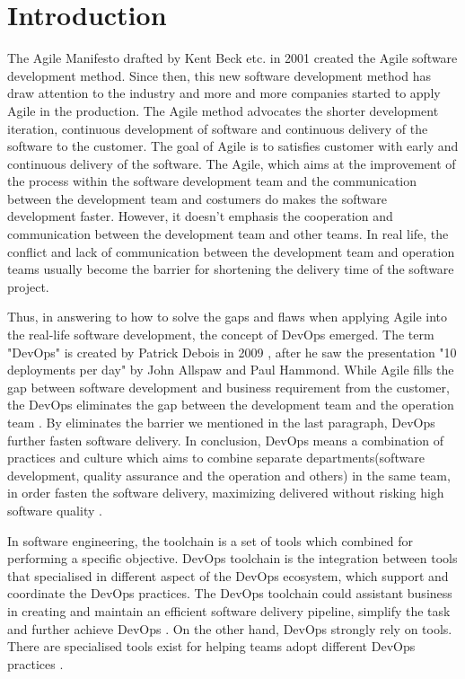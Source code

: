 \chapter{Introduction}
\label{chp:introduction}
The Agile Manifesto \cite{beck2001manifesto} drafted by Kent Beck etc. in 2001 created the Agile software development method. Since then, this new software development method has draw attention to the industry and more and more companies started to apply Agile in the production.
The Agile method advocates the shorter development iteration, continuous development of software and continuous delivery of the software to the customer. The goal \cite{beck2001manifesto} of Agile is to satisfies customer with early and continuous delivery of the software.
The Agile, which aims at the improvement of the process within the software development team and the communication between the development team and costumers \cite{miglierina2014application} do makes the software development faster. However, it doesn't emphasis the cooperation and communication between the development team and other teams. In real life, the conflict and lack of communication between the development team and operation teams usually become the barrier for shortening the delivery time of the software project.
\par
Thus, in answering to how to solve the gaps and flaws when applying Agile into the real-life software development, the concept of DevOps emerged. The term "DevOps" is created by Patrick Debois in 2009 \cite{kim2016devops}, after he saw the presentation "10 deployments per day" by John Allspaw and Paul Hammond. While Agile fills the gap between software development and business requirement from the customer, the DevOps eliminates the gap between the development team and the operation team \cite{WhatisaD20:online}. By eliminates the barrier we mentioned in the last paragraph, DevOps further fasten software delivery. In conclusion, DevOps means a combination of practices and culture which aims to combine separate departments(software development, quality assurance and the operation and others) in the same team, in order fasten the software delivery, maximizing delivered without risking high software quality \cite{DevOpsWi87:online}\cite{ebert2016devops}.
\par
In software engineering, the toolchain is a set of tools which combined for performing a specific objective. DevOps toolchain is the integration between tools that specialised in different aspect of the DevOps ecosystem, which support and coordinate the DevOps practices. The DevOps toolchain could assistant business in creating and maintain an efficient software delivery pipeline, simplify the task and further achieve DevOps \cite{DevOpsto7:online}. On the other hand, DevOps strongly rely on tools. There are specialised tools exist for helping teams adopt different DevOps practices \cite{zhu2016devops}.

